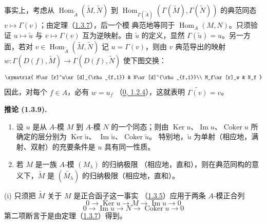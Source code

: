 \documentclass[UTF8,fontset=none,11pt,oneside,openany]{ctexbook}
\newenvironment{corollary}[1][]{%
  \par\medskip\noindent\textbf{推论 (#1).}\ %
}{\par}
\let\EGAOriginalLabel\label
\renewcommand{\label}[1]{\phantomsection\EGAOriginalLabel{#1}}
\begin{document}
事实上，考虑从
$\operatorname{Hom}_{\widetilde{A}}(\widetilde{M},\widetilde{N})$ 到
$\operatorname{Hom}_{\Gamma(\widetilde{A})}
(\Gamma(\widetilde{M}),\Gamma(\widetilde{N}))$ 的典范同态
$v\mapsto\Gamma(v)$；由定理（\hyperref[I.1.3.7-fr]{1.3.7}），后一个模
典范地等同于 $\operatorname{Hom}_A(M,N)$。只须验证
$u\mapsto\widetilde{u}$ 与 $v\mapsto\Gamma(v)$ 互为逆映射。由
$\widetilde{u}$ 的定义，显然 $\Gamma(\widetilde{u})=u$。另一方面，若对
$v\in\operatorname{Hom}_{\widetilde{A}}(\widetilde{M},\widetilde{N})$ 记
$u=\Gamma(v)$，则由 $v$ 典范导出的映射
$w:\Gamma(D(f),\widetilde{M})\to\Gamma(D(f),\widetilde{N})$ 使下图交换：
\[
  \xymatrix{
    M\ar[r]^u\ar[d]_{\rho_{f,1}} & N\ar[d]^{\rho_{f,1}}\\
    M_f\ar[r]_w & N_f
  }
\]
因此，对每个 $f\in A$，必有 $w=u_f$
（\hyperref[0.1.2.4-fr]{0, 1.2.4}），这就表明
$\widetilde{\Gamma(v)}=v$。

\begin{corollary}[1.3.9]
\label{I.1.3.9-fr}
\begin{enumerate}
  \item[\rm(i)] 设 $u$ 是从 $A$-模 $M$ 到 $A$-模 $N$ 的一个同态；则由
  $\operatorname{Ker}u$、$\operatorname{Im}u$、$\operatorname{Coker}u$
  所确定的层分别为 $\operatorname{Ker}\widetilde{u}$、
  $\operatorname{Im}\widetilde{u}$、$\operatorname{Coker}\widetilde{u}$。
  特别地，$\widetilde{u}$ 为单射（相应地，满射、双射）的充要条件是
  $u$ 具有同一性质。
  \item[\rm(ii)] 若 $M$ 是一族 $A$-模 $(M_\lambda)$ 的归纳极限
  （相应地，直和），则在典范同构的意义下，$\widetilde{M}$ 是
  $(\widetilde{M_\lambda})$ 的归纳极限（相应地，直和）。
\end{enumerate}
\end{corollary}

(i) 只须把 $\widetilde{M}$ 关于 $M$ 是正合函子这一事实
（\hyperref[I.1.3.5-fr]{1.3.5}）应用于两条 $A$-模正合列
\[
  0\to\operatorname{Ker}u\to M\to\operatorname{Im}u\to0
\]
\[
  0\to\operatorname{Im}u\to N\to\operatorname{Coker}u\to0
\]
第二项断言于是由定理（\hyperref[I.1.3.7-fr]{1.3.7}）得到。
\end{document}
